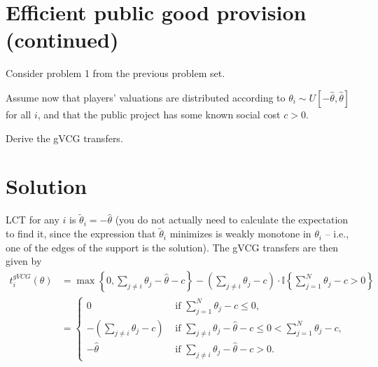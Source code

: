 \documentclass[a4paper]{article}
\newif\ifsolutions
\begin{document}
\section{Efficient public good provision (continued)}

Consider problem 1 from the previous problem set.

Assume now that players' valuations are distributed according to $\theta_i \sim U[-\hat{\theta},\hat{\theta}]$ for all $i$, and that the public project has some known social cost $c > 0$.

Derive the gVCG transfers.


\ifsolutions
\section*{Solution}
LCT for any $i$ is $\tilde{\theta}_i = -\hat{\theta}$ (you do not actually need to calculate the expectation to find it, since the expression that $\tilde{\theta}_i$ minimizes is weakly monotone in $\theta_i$ -- i.e., one of the edges of the support is the solution). The gVCG transfers are then given by
\begin{align*}
	t_i^{gVCG}(\theta) &= \max \left\{0, \sum_{j\neq i}\theta_j -\hat{\theta} - c \right\} - \left(\sum_{j\neq i}\theta_j -c\right) \cdot \mathbb{I} \left\{ \sum_{j=1}^N \theta_j - c > 0 \right\}
	\\
	&= \begin{cases}
		0	&	\text{ if } \sum_{j=1}^N \theta_j - c \leq 0,
		\\
		-\left(\sum_{j\neq i}\theta_j - c \right)	&	\text{ if }	\sum_{j\neq i} \theta_j - \hat{\theta} - c \leq 0 < \sum_{j=1}^N \theta_j - c,
		\\
		-\hat{\theta}	&	\text{ if } \sum_{j\neq i}\theta_j -\hat{\theta} - c > 0.
	\end{cases}
\end{align*}
\end{document}

